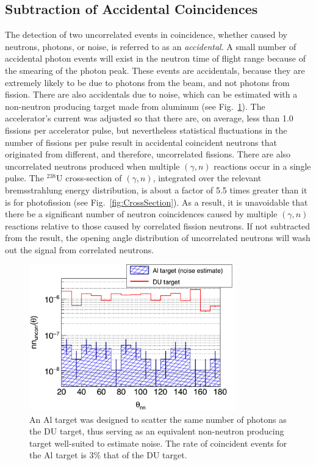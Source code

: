\subsection{Subtraction of Accidental Coincidences}
\label{Reconstruction of Accidental Coincidence}
The detection of two uncorrelated events in coincidence, whether caused by neutrons, photons, or noise, is referred to as an \emph{accidental}.
A small number of accidental photon events will exist in the neutron time of flight range because of the smearing of the photon peak.
These events are accidentals, because they are extremely likely to be due to photons from the beam, and not photons from fission.
There are also accidentals due to noise, which can be estimated with a non-neutron producing target made from aluminum (see Fig.~\ref{fig:Noise}).
The accelerator's current was adjusted so that there are, on average, less than 1.0 fissions per accelerator pulse, but nevertheless statistical fluctuations in the number of fissions per pulse result in accidental coincident neutrons that originated from different, and therefore, uncorrelated fissions.
There are also uncorrelated neutrons produced when multiple $(\gamma, n)$ reactions occur in a single pulse.
The $^{238}$U cross-section of $(\gamma, n)$, integrated over the relevant bremsstrahlung energy distribution, is about a factor of 5.5 times greater than it is for photofission (see Fig.~\ref{fig:CrossSection}).
As a result, it is unavoidable that there be a significant number of neutron coincidences caused by multiple $(\gamma, n)$ reactions relative to those caused by correlated fission neutrons.
If not subtracted from the result, the opening angle distribution of uncorrelated neutrons will wash out the signal from correlated neutrons. 
\begin{figure}[]
\centering
    \includegraphics[width=0.8\textwidth]{Content/Methods/Noise.png}
    \caption{An Al target was designed to scatter the same number of photons as the DU target, thus serving as an equivalent non-neutron producing target well-suited to estimate noise.
    The rate of coincident events for the Al target is 3\% that of the DU target. 
        }
    \label{fig:Noise}
\end{figure}
